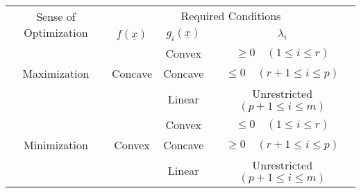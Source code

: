 \documentclass[../main-sheet.tex]{subfiles}
\begin{document}
    \begin{table}[H]
        \centering
        \begin{tabular}{cccc}
            \toprule
            \multirow{2}{*}{Sense of Optimization} & \multicolumn{3}{c}{Required Conditions}                                  \\ \cmidrule(l){2-4} 
                                   & $f(\underline{x})$ & $g_i(\underline{x})$ & \multicolumn{1}{c}{$\lambda_i$} \\ \midrule
                                   &                    & Convex               & $\geq 0 \quad (1\leq i\leq r)$     \\
            Maximization                    & Concave            & Concave              & $\leq 0 \quad (r+1\leq i\leq p)$     \\
                                   &                    & Linear               & Unrestricted \((p+1\leq i\leq m)\) \\\midrule
                                   &                    & Convex               & $\leq 0 \quad (1\leq i\leq r)$     \\
            Minimization                    & Convex             & Concave              & $\geq 0 \quad (r+1\leq i\leq p)$     \\
                                   &                    & Linear               & Unrestricted \((p+1\leq i\leq m)\) \\ \bottomrule
            \end{tabular}
    \end{table}
\end{document}
